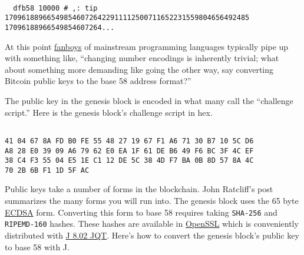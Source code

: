 \begin{tcolorbox}[breakable, size=fbox, boxrule=1pt, pad at break*=1mm,colback=cellbackground, colframe=cellborder]
\begin{lstlisting}[language=jdoc, frame=single,framerule=0pt,label=lst:scr4754X0c]

  dfb58 10000 # ,: tip
1709618896654985460726422911112500711652231559804656492485 17096188966549854607264...
\end{lstlisting}
\end{tcolorbox}

At this point
\href{http://www.urbandictionary.com/define.php?term=fanboy}{fanboys} of
mainstream programming languages typically pipe up with something like,
``changing number encodings is inherently trivial; what about something
more demanding like going the other way, say converting Bitcoin public
keys to the base 58 address format?''

The public key in the genesis block is encoded in what many call the
``challenge script.'' Here is the genesis block's challenge script in
hex.

\begin{tcolorbox}[breakable, size=fbox, boxrule=1pt, pad at break*=1mm,colback=cellbackground, colframe=cellborder]
\begin{lstlisting}[language=jdoc, frame=single,framerule=0pt,label=lst:scr4754X0d]

41 04 67 8A FD B0 FE 55 48 27 19 67 F1 A6 71 30 B7 10 5C D6 
A8 28 E0 39 09 A6 79 62 E0 EA 1F 61 DE B6 49 F6 BC 3F 4C EF 
38 C4 F3 55 04 E5 1E C1 12 DE 5C 38 4D F7 BA 0B 8D 57 8A 4C 
70 2B 6B F1 1D 5F AC 
\end{lstlisting}
\end{tcolorbox}

Public keys take a number of forms in the blockchain. John Ratcliff's
post summarizes the many forms you will run into. The genesis block uses
the 65 byte
\href{http://blog.cloudflare.com/ecdsa-the-digital-signature-algorithm-of-a-better-internet}{ECDSA}
form. Converting this form to base 58 requires taking \texttt{SHA-256}
and \texttt{RIPEMD-160} hashes. These hashes are available in
\href{http://www.openssl.org/}{OpenSSL} which is conveniently
distributed with
\href{http://www.jsoftware.com/jwiki/Guides/Qt\%20IDE/Install}{J 8.02
JQT}. Here's how to convert the genesis block's public key to base 58
with J.

